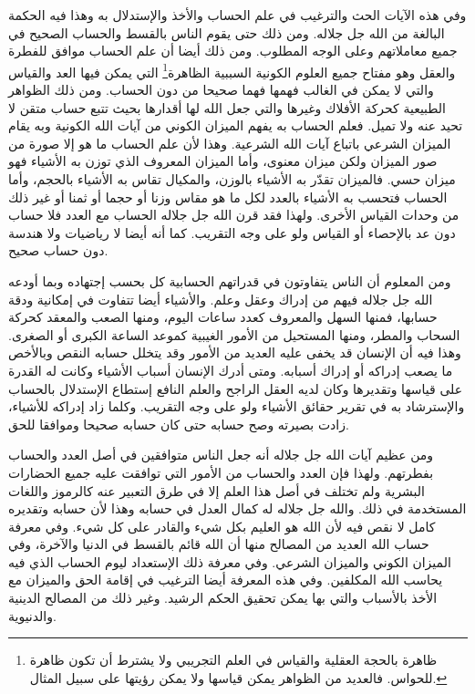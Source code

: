 وفي هذه الآيات الحث والترغيب في علم الحساب والأخذ والإستدلال به وهذا فيه الحكمة البالغة من الله جل جلاله. ومن ذلك حتى يقوم الناس بالقسط والحساب الصحيح في جميع معاملاتهم وعلى الوجه المطلوب. ومن ذلك أيضا أن علم الحساب موافق للفطرة والعقل وهو مفتاح جميع العلوم الكونية السببية الظاهرة\footnote{ظاهرة بالحجة العقلية والقياس في العلم التجريبي ولا يشترط أن تكون ظاهرة للحواس. فالعديد من الظواهر يمكن قياسها ولا يمكن رؤيتها على سبيل المثال.} التي يمكن فيها العد والقياس والتي لا يمكن في الغالب فهمها فهما صحيحا من دون الحساب. ومن ذلك الظواهر الطبيعية كحركة الأفلاك وغيرها والتي جعل الله لها أقدارها بحيث تتبع حساب متقن لا تحيد عنه ولا تميل. فعلم الحساب به يفهم الميزان الكوني من آيات الله الكونية وبه يقام الميزان الشرعي باتباع آيات الله الشرعية. وهذا لأن علم الحساب ما هو إلا صورة من صور الميزان ولكن ميزان معنوى، وأما الميزان المعروف الذي توزن به الأشياء فهو ميزان حسي. فالميزان تقدّر به الأشياء بالوزن، والمكيال تقاس به الأشياء بالحجم، وأما الحساب فتحسب به الأشياء بالعدد لكل ما هو مقاس وزنا أو حجما أو ثمنا أو غير ذلك من وحدات القياس الأخرى. ولهذا فقد قرن الله جل جلاله الحساب مع العدد فلا حساب دون عد بالإحصاء أو القياس ولو على وجه التقريب. كما أنه أيضا لا رياضيات ولا هندسة دون حساب صحيح.

ومن المعلوم أن الناس يتفاوتون في قدراتهم الحسابية كل بحسب إجتهاده وبما أودعه الله جل جلاله فيهم من إدراك وعقل وعلم. والأشياء أيضا تتفاوت في إمكانية ودقة حسابها، فمنها السهل والمعروف كعدد ساعات اليوم، ومنها الصعب والمعقد كحركة السحاب والمطر، ومنها المستحيل من الأمور الغيبية كموعد الساعة الكبرى أو الصغرى. وهذا فيه أن الإنسان قد يخفى عليه العديد من الأمور وقد يتخلل حسابه النقص وبالأخص ما يصعب إدراكه أو إدراك أسبابه. ومتى أدرك الإنسان أسباب الأشياء وكانت له القدرة على قياسها وتقديرها وكان لديه العقل الراجح والعلم النافع إستطاع الإستدلال بالحساب والإسترشاد به في تقرير حقائق الأشياء ولو على وجه التقريب. وكلما زاد إدراكه للأشياء، زادت بصيرته وصح حسابه حتى كان حسابه صحيحا وموافقا للحق. 

ومن عظيم آيات الله جل جلاله أنه جعل الناس متوافقين في أصل العدد والحساب بفطرتهم. ولهذا فإن العدد والحساب من الأمور التي توافقت عليه جميع الحضارات البشرية ولم تختلف في أصل هذا العلم إلا في طرق التعبير عنه كالرموز واللغات المستخدمة في ذلك. والله جل جلاله له كمال العدل في حسابه وهذا لأن حسابه وتقديره كامل لا نقص فيه لأن الله هو العليم بكل شيء والقادر على كل شيء. وفي معرفة حساب الله العديد من المصالح منها أن الله قائم بالقسط في الدنيا والآخرة، وفي الميزان الكوني والميزان الشرعي. وفي معرفة ذلك الإستعداد ليوم الحساب الذي فيه يحاسب الله المكلفين. وفي هذه المعرفة أيضا الترغيب في إقامة الحق والميزان مع الأخذ بالأسباب والتي بها يمكن تحقيق الحكم الرشيد. وغير ذلك من المصالح الدينية والدنيوية.

